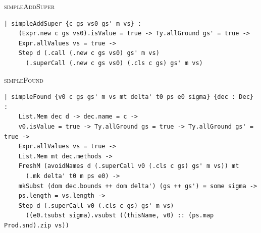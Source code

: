 \begin{cmp}{\textsc{simpleAddSuper}}
\begin{paperside}
\end{paperside}
\begin{leanside}
\begin{lstlisting}[style=leanside]
| simpleAddSuper {c gs vs0 gs' m vs} :
    (Expr.new c gs vs0).isValue = true -> Ty.allGround gs' = true ->
    Expr.allValues vs = true ->
    Step d (.call (.new c gs vs0) gs' m vs)
      (.superCall (.new c gs vs0) (.cls c gs) gs' m vs)
\end{lstlisting}
\end{leanside}
\end{cmp}

\begin{cmp}{\textsc{simpleFound}}
\begin{paperside}
\end{paperside}
\begin{leanside}
\begin{lstlisting}[style=leanside]
| simpleFound {v0 c gs gs' m vs mt delta' t0 ps e0 sigma} {dec : Dec} :
    List.Mem dec d -> dec.name = c ->
    v0.isValue = true -> Ty.allGround gs = true -> Ty.allGround gs' = true ->
    Expr.allValues vs = true ->
    List.Mem mt dec.methods ->
    FreshM (avoidNames d (.superCall v0 (.cls c gs) gs' m vs)) mt
      (.mk delta' t0 m ps e0) ->
    mkSubst (dom dec.bounds ++ dom delta') (gs ++ gs') = some sigma ->
    ps.length = vs.length ->
    Step d (.superCall v0 (.cls c gs) gs' m vs)
      ((e0.tsubst sigma).vsubst ((thisName, v0) :: (ps.map Prod.snd).zip vs))
\end{lstlisting}
\end{leanside}
\end{cmp}

